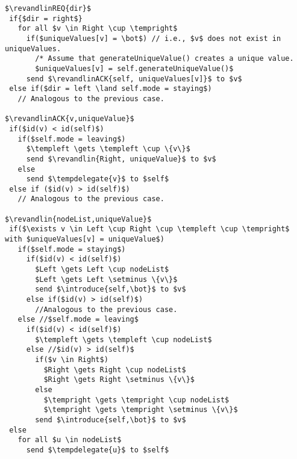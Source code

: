 \documentclass[a4paper,USenglish]{lipics}
\newcommand{\blpp}{\textsc{Build-List*}\xspace}
\newcommand{\introduce}[1]{\textsc{Introduce(\ensuremath{#1})}\xspace}
\newcommand{\tempdelegate}[1]{\textsc{TempDelegate(\ensuremath{#1})}\xspace}
\newcommand{\revandlin}[1]{\textsc{ReverseAndLinearize(\ensuremath{#1})}\xspace} \newcommand{\revandlinREQ}[1]{\textsc{ReverseAndLinearizeREQ(#1)}\xspace}
\newcommand{\revandlinACK}[1]{\textsc{ReverseAndLinearizeACK(#1)}\xspace}
\newcommand{\templeft}[1][]{\ensuremath{Temp_{L}\ifthenelse{\isempty{#1}}{}{(#1)}}\xspace}
\newcommand{\tempright}[1][]{\ensuremath{Temp_{R}\ifthenelse{\isempty{#1}}{}{(#1)}}\xspace}
\begin{document}
\begin{lstlisting}[mathescape=true,caption=\blpp protocol (continued)] 
$\revandlinREQ{dir}$
 if{$dir = right$}
   for all $v \in Right \cup \tempright$ 
     if($uniqueValues[v] = \bot$) // i.e., $v$ does not exist in uniqueValues.
       /* Assume that generateUniqueValue() creates a unique value.
       $uniqueValues[v] = self.generateUniqueValue()$
     send $\revandlinACK{self, uniqueValues[v]}$ to $v$
 else if($dir = left \land self.mode = staying$) 
   // Analogous to the previous case.  

$\revandlinACK{v,uniqueValue}$
 if($id(v) < id(self)$)
   if($self.mode = leaving$)
     $\templeft \gets \templeft \cup \{v\}$
     send $\revandlin{Right, uniqueValue}$ to $v$
   else
     send $\tempdelegate{v}$ to $self$
 else if ($id(v) > id(self)$) 
   // Analogous to the previous case. 

$\revandlin{nodeList,uniqueValue}$
 if($\exists v \in Left \cup Right \cup \templeft \cup \tempright$ with $uniqueValues[v] = uniqueValue$)
   if($self.mode = staying$)
     if($id(v) < id(self)$)
       $Left \gets Left \cup nodeList$ 
       $Left \gets Left \setminus \{v\}$
       send $\introduce{self,\bot}$ to $v$
     else if($id(v) > id(self)$) 
       //Analogous to the previous case.
   else //$self.mode = leaving$
     if($id(v) < id(self)$)
       $\templeft \gets \templeft \cup nodeList$ 
     else //$id(v) > id(self)$
       if($v \in Right$)
         $Right \gets Right \cup nodeList$
         $Right \gets Right \setminus \{v\}$
       else
         $\tempright \gets \tempright \cup nodeList$
         $\tempright \gets \tempright \setminus \{v\}$
       send $\introduce{self,\bot}$ to $v$
 else
   for all $u \in nodeList$
     send $\tempdelegate{u}$ to $self$
\end{lstlisting}
\end{document}
